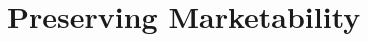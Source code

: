 \chapter{Preserving Marketability}





\begin{questions}

\end{questions}




\begin{questions}

\end{questions}






\begin{questions}

\end{questions}
